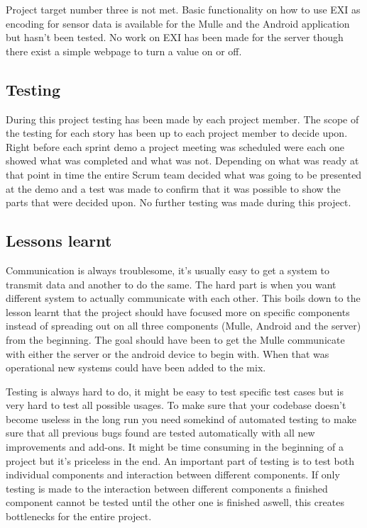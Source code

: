 Project target number three is not met.
Basic functionality on how to use EXI as encoding for sensor data is available for the Mulle and the Android application but hasn't been tested.
No work on EXI has been made for the server though there exist a simple webpage to turn a value on or off.

\subsection{Testing}
During this project testing has been made by each project member.
The scope of the testing for each story has been up to each project member to decide upon.
Right before each sprint demo a project meeting was scheduled were each one showed what was completed and what was not.
Depending on what was ready at that point in time the entire Scrum team decided what was going to be presented at the demo and a test was made to confirm that it was possible to show the parts that were decided upon.
No further testing was made during this project.
\subsection{Lessons learnt}
Communication is always troublesome, it's usually easy to get a system to transmit data and another to do the same.
The hard part is when you want different system to actually communicate with each other.
This boils down to the lesson learnt that the project should have focused more on specific components instead of spreading out on all three components (Mulle, Android and the server) from the beginning.
The goal should have been to get the Mulle communicate with either the server or the android device to begin with.
When that was operational new systems could have been added to the mix.

Testing is always hard to do, it might be easy to test specific test cases but is very hard to test all possible usages.
To make sure that your codebase doesn't become useless in the long run you need somekind of automated testing to make sure that all previous bugs found are tested automatically with all new improvements and add-ons.
It might be time consuming in the beginning of a project but it's priceless in the end.
An important part of testing is to test both individual components and interaction between different components.
If only testing is made to the interaction between different components a finished component cannot be tested until the other one is finished aswell, this creates bottlenecks for the entire project.

